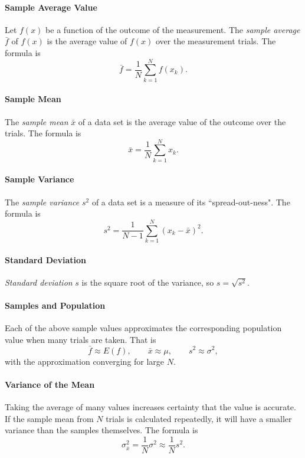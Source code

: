 \documentclass[11pt]{article}
\begin{document}
\paragraph*{Sample Average Value}
Let $f(x)$ be a function of the outcome of the measurement. The \textit{sample average} $\bar{f}$ of $f(x)$ is the average value of $f(x)$ over the measurement trials. The formula is
\begin{equation*}
	\bar{f} = \frac{1}{N} \sum_{k=1}^{N} f(x_k) .
\end{equation*}

\paragraph*{Sample Mean}
The \textit{sample mean} $\bar{x}$ of a data set is the average value of the outcome over the trials. The formula is
\begin{equation*}
	\bar{x} = \frac{1}{N} \sum_{k=1}^{N}  x_k .
\end{equation*}

\paragraph*{Sample Variance}
The \textit{sample variance} $s^2$ of a data set is a measure of its ``spread-out-ness".
The formula is
\begin{equation*}
	s^2 = \frac{1}{N-1} \sum_{k=1}^{N}  (x_k - \bar{x})^2 .
\end{equation*}


\paragraph*{Standard Deviation}
\textit{Standard deviation} $s$ is the square root of the variance, so $s = \sqrt{s^2}$. 

\paragraph*{Samples and Population}
Each of the above sample values approximates the corresponding population value when many trials are taken. That is
\begin{equation*}
\bar{f}\approx E(f), \qquad \bar{x} \approx \mu, \qquad s^2 \approx \sigma^2,
\end{equation*}
with the approximation converging for large $N$.

\paragraph*{Variance of the Mean}
Taking the average of many values increases certainty that the value is accurate. If the sample mean from $N$ trials is calculated repeatedly, it will have a smaller variance than the samples themselves. The formula is
\begin{equation*}
	\sigma_{\bar{x}}^2 = \frac{1}{N} \sigma^2 \approx \frac{1}{N} s^2 .
\end{equation*}
\end{document}

